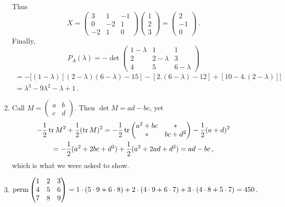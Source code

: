 \begin{enumerate}
Thus
\[
X=\begin{pmatrix}3&1& -1\\ 0&-2& 1 \\-2&1 & 0 \end{pmatrix}
\begin{pmatrix}1\\2\\3
\end{pmatrix}=
\begin{pmatrix}2\\-1\\0
\end{pmatrix}\, .
\]
Finally, 
\[
P_A(\lambda)=-\det \begin{pmatrix}1-\lambda&1&1\\2&2-\lambda&3\\4&5&6-\lambda\end{pmatrix}\]
\begin{gather*}
=-\Big[(1-\lambda)[(2-\lambda)(6-\lambda)-15]-[2.(6-\lambda)-12]+[10-4.(2-\lambda)]\Big]
\\
=\lambda^3-9\lambda^2-\lambda+1\, .
\end{gather*}
\item
Call $M=\begin{pmatrix}a&b\\c&d\end{pmatrix}$. Then $\det M= ad-bc$, yet
\begin{gather*}
-\frac 12 \operatorname{tr} M^2 + \frac12 (\operatorname{tr} M)^2 = -\frac 12 \operatorname{tr} \begin{pmatrix}a^2 + bc & * \\ * & bc + d^2\end{pmatrix} -\frac12 (a+d)^2\\ 
=-\frac 12 (a^2 + 2bc + d^2) + \frac 12 (a^2 + 2ad + d^2) = ad - bc\, ,
\end{gather*}
which is what we were asked to show.

\item 

\[
\operatorname{perm}\begin{pmatrix}1 & 2 & 3 \\ 4 & 5 & 6 \\ 7 & 8 & 9\end{pmatrix}
=1\cdot(5\cdot9+6\cdot8)+2\cdot(4\cdot9+6\cdot7)+3\cdot(4\cdot8+5\cdot7)=450\, .
\]


\end{enumerate}
